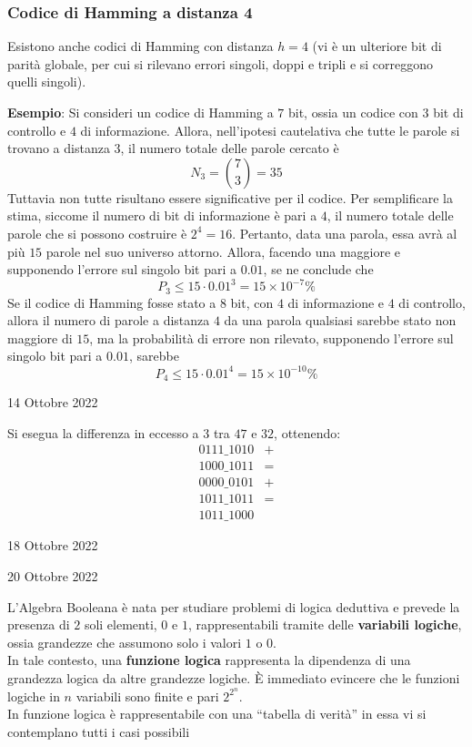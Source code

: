 \documentclass[a4paper]{extarticle}
\begin{document}
\vspace{1em}
\subsubsection{Codice di Hamming a distanza 4}
Esistono anche codici di Hamming con distanza $h=4$ (vi è un ulteriore bit di parità globale, per cui si rilevano errori singoli, doppi e tripli e si correggono quelli singoli).

\vspace{2em}
\noindent
\textbf{Esempio}: Si consideri un codice di Hamming a $7$ bit, ossia un codice con $3$ bit di controllo e $4$ di informazione. Allora, nell'ipotesi cautelativa che tutte le parole si trovano a distanza $3$, il numero totale delle parole cercato è
\[N_3 = \binom{7}{3} = 35\]
Tuttavia non tutte risultano essere significative per il codice. Per semplificare la stima, siccome il numero di bit di informazione è pari a $4$, il numero totale delle parole che si possono costruire è $2^4=16$. Pertanto, data una parola, essa avrà al più $15$ parole nel suo universo attorno. Allora, facendo una maggiore e supponendo l'errore sul singolo bit pari a $0.01$, se ne conclude che
\[P_3 \leq 15 \cdot 0.01^3 = 15 \times 10^{-7}\%\]
Se il codice di Hamming fosse stato a $8$ bit, con $4$ di informazione e $4$ di controllo, allora il numero di parole a distanza $4$ da una parola qualsiasi sarebbe stato non maggiore di $15$, ma la probabilità di errore non rilevato, supponendo l'errore sul singolo bit pari a $0.01$, sarebbe
\[P_4 \leq 15 \cdot 0.01^4 = 15 \times 10^{-10}\%\]

\newpage
\begin{center}
    14 Ottobre 2022
\end{center}
Si esegua la differenza in eccesso a $3$ tra $47$ e $32$, ottenendo:
\begin{align*}
    0111\_1010 & +\\
    1000\_1011 & =\\
    0000\_0101 & +\\
    1011\_1011 & =\\
    1011\_1000
\end{align*}

\newpage
\begin{center}
    18 Ottobre 2022
\end{center}

\newpage
\begin{center}
    20 Ottobre 2022
\end{center}
L'Algebra Booleana è nata per studiare problemi di logica deduttiva e prevede la presenza di $2$ soli elementi, $0$ e $1$, rappresentabili tramite delle \textbf{variabili logiche}, ossia grandezze che assumono solo i valori $1$ o $0$.\\
In tale contesto, una \textbf{funzione logica} rappresenta la dipendenza di una grandezza logica da altre grandezze logiche. È immediato evincere che le funzioni logiche in $n$ variabili sono finite e pari $2^{2^n}$.\\
In funzione logica è rappresentabile con una “tabella di verità” in essa vi si contemplano tutti i casi possibili
\end{document}
